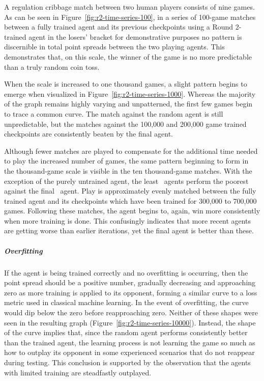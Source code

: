 
A regulation cribbage match between two human players consists of nine games.
%
As can be seen in Figure~\ref{fig:r2-time-series-100},
in a series of 100-game matches between a fully trained agent and its
previous checkpoints\textemdash
using a Round 2-trained agent in the losers' bracket for demonstrative
purposes\textemdash
no pattern is discernible in total point spreads between the two playing agents.
%
This demonstrates that,
on this scale,
the winner of the game is no more predictable than a truly random coin toss.

When the scale is increased to one thousand games,
a slight pattern begins to emerge
when visualized in Figure~\ref{fig:r2-time-series-1000}.
%
Whereas the majority of the graph remains highly varying and unpatterned,
the first few games begin to trace a common curve.
%
The match against the random agent is still unpredictable,
but the matches against the 100,000 and 200,000 game trained checkpoints are
consistently beaten by the final agent.

Although fewer matches are played to compensate for the additional time needed to
play the increased number of games,
the same pattern beginning to form in the thousand-game scale is visible in the
ten thousand-game matches.
%
With the exception of the purely untrained agent,
the least \learned\ agents perform the poorest against the final
\learned\ agent.
%
Play is approximately evenly matched between the fully trained agent
and its checkpoints which have been trained for 300,000 to 700,000 games.
%
Following these matches,
the agent begins to, again, win more consistently when more training is done.
%
This confusingly indicates that more recent agents are getting worse
than earlier iterations,
yet the final agent is better than these.
%

\subparagraph*{Overfitting}

If the agent is being trained correctly and no overfitting is occurring,
then the point spread should be a positive number,
gradually decreasing and approaching zero
as more training is applied to its opponent,
forming a similar curve to a loss metric used in classical machine learning.
%
In the event of overfitting,
the curve would dip below the zero before reapproaching zero.
%
Neither of these shapes were seen in the resulting graph
(Figure~\ref{fig:r2-time-series-10000}).
%
Instead,
the shape of the curve implies that,
since the random agent performs consistently better than the trained agent,
the learning process is not learning the game so much as how to outplay its
opponent in some experienced scenarios that do not reappear during testing.
%
This conclusion is supported by the observation that the agents with limited
training are steadfastly outplayed.

